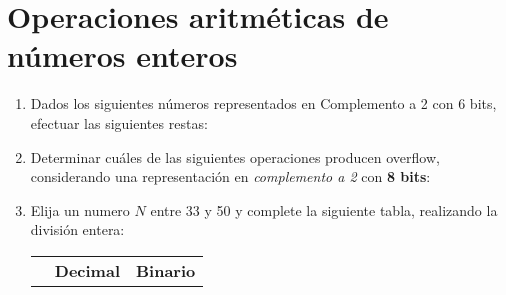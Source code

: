 \documentclass[12pt]{article}
\begin{document}
\section{Operaciones aritméticas de números enteros}

\begin{enumerate}

    \item Dados los siguientes números representados en Complemento a 2 con 6
        bits, efectuar las siguientes restas:


    \item Determinar cuáles de las siguientes operaciones producen overflow,
        considerando una representación en \emph{complemento a 2} con
        \textbf{8 bits}:


    \item Elija un numero $N$ entre 33 y 50 y complete la siguiente tabla,
        realizando la división entera:

        \begin{center}

            \begin{tabular}[t]{|c|c|c|}

            \cline{2-3}

            \multicolumn{1}{c|}{}& \textbf{Decimal} & \textbf{Binario} \\


\end{tabular}
\end{center}
\end{enumerate}
\end{document}
